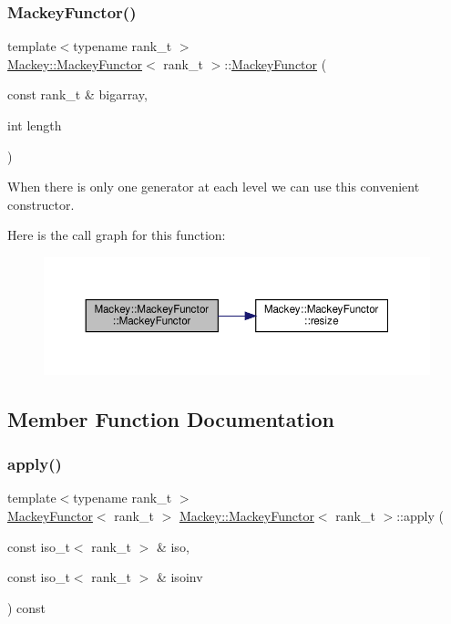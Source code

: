\subsubsection{\texorpdfstring{Mackey\+Functor()}{MackeyFunctor()}\hspace{0.1cm}{\footnotesize\ttfamily [2/2]}}
{\footnotesize\ttfamily template$<$typename rank\+\_\+t $>$ \\
\hyperlink{classMackey_1_1MackeyFunctor}{Mackey\+::\+Mackey\+Functor}$<$ rank\+\_\+t $>$\+::\hyperlink{classMackey_1_1MackeyFunctor}{Mackey\+Functor} (\begin{DoxyParamCaption}\item[{const rank\+\_\+t \&}]{bigarray,  }\item[{int}]{length }\end{DoxyParamCaption})}



When there is only one generator at each level we can use this convenient constructor. 

Here is the call graph for this function\+:\nopagebreak
\begin{figure}[H]
\begin{center}
\leavevmode
\includegraphics[width=350pt]{classMackey_1_1MackeyFunctor_a7cdc1be794a7b39e7d4b86c2ad26355e_cgraph}
\end{center}
\end{figure}


\subsection{Member Function Documentation}
\mbox{\label{classMackey_1_1MackeyFunctor_a6522cfe1071ccb92ff3db38d89e14687}} 
\subsubsection{\texorpdfstring{apply()}{apply()}}
{\footnotesize\ttfamily template$<$typename rank\+\_\+t $>$ \\
\hyperlink{classMackey_1_1MackeyFunctor}{Mackey\+Functor}$<$ rank\+\_\+t $>$ \hyperlink{classMackey_1_1MackeyFunctor}{Mackey\+::\+Mackey\+Functor}$<$ rank\+\_\+t $>$\+::apply (\begin{DoxyParamCaption}\item[{const iso\+\_\+t$<$ rank\+\_\+t $>$ \&}]{iso,  }\item[{const iso\+\_\+t$<$ rank\+\_\+t $>$ \&}]{isoinv }\end{DoxyParamCaption}) const}



